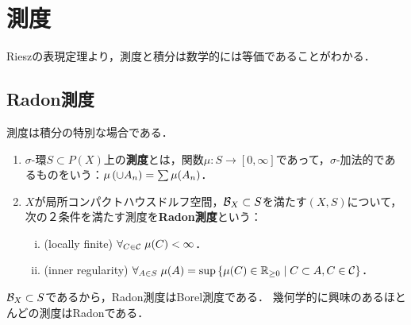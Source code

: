 \documentclass[uplatex,dvipdfmx]{jsreport}
\begin{document}
\section{測度}

\begin{tcolorbox}[colframe=ForestGreen, colback=ForestGreen!10!white,breakable,colbacktitle=ForestGreen!40!white,coltitle=black,fonttitle=\bfseries\sffamily,
title=]
    Rieszの表現定理より，測度と積分は数学的には等価であることがわかる．
\end{tcolorbox}

\subsection{Radon測度}

\begin{tcolorbox}[colframe=ForestGreen, colback=ForestGreen!10!white,breakable,colbacktitle=ForestGreen!40!white,coltitle=black,fonttitle=\bfseries\sffamily,
title=]
    測度は積分の特別な場合である．
\end{tcolorbox}

\begin{definition}\mbox{}
    \begin{enumerate}
        \item $\sigma$-環$S\subset P(X)$上の\textbf{測度}とは，関数$\mu:S\to[0,\infty]$であって，$\sigma$-加法的であるものをいう：$\mu\left(\cup A_n\right)=\sum\mu(A_n)$．
        \item $X$が局所コンパクトハウスドルフ空間，$\mathcal{B}_X\subset S$を満たす$(X,S)$について，次の２条件を満たす測度を\textbf{Radon測度}という：
        \begin{enumerate}[(i)]
            \item (locally finite) $\forall_{C\in\mathcal{C}}\;\mu(C)<\infty$．
            \item (inner regularity) $\forall_{A\in S}\;\mu(A)=\sup\left\{\mu(C)\in\mathbb{R}_{\ge0}\mid C\subset A,C\in\mathcal{C}\right\}$．
        \end{enumerate}
    \end{enumerate}
\end{definition}
\begin{remark}
    $\mathcal{B}_X\subset S$であるから，Radon測度はBorel測度である．
    幾何学的に興味のあるほとんどの測度はRadonである．
\end{remark}
\end{document}

